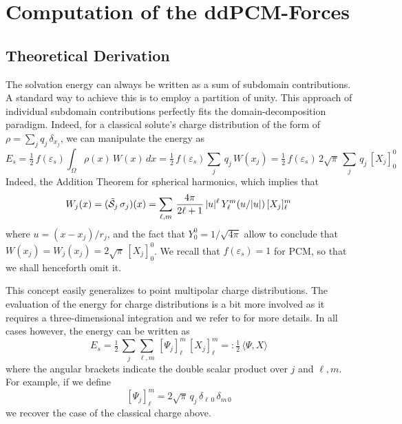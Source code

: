 \section{Computation of the ddPCM-Forces}\label{sec:forces}

\subsection{Theoretical Derivation}

The solvation energy can always be written as a sum of subdomain contributions. A standard way to achieve this is to employ a partition of unity. This  approach of individual subdomain contributions perfectly fits the domain-decomposition paradigm. Indeed, for a classical solute's charge distribution of the form of $\rho=\sum_j q_j \, \delta_{x_j}$, we can manipulate the energy as
\[
	E_s 
	= \tfrac{1}{2} \, f(\varepsilon_s)  \int_{\Omega} \rho(x) \, W(x) \, dx
	= \tfrac{1}{2} \, f(\varepsilon_s) \sum_j \, q_j \,  W(x_j)
	= \tfrac{1}{2} \, f(\varepsilon_s) \,{2\sqrt{\pi}}\, \sum_j  \,q_j \, [X_j]_0^0
\]
Indeed, the Addition Theorem for spherical harmonics, which implies that
\[
W_j(x) = (\tilde{\mathcal{S}}_j \, \sigma_j)(x)  = \sum_{\ell,m} \, \frac{4\pi}{ 2\ell + 1} \, |u|^\ell \, Y_\ell^m(u/|u|) \, [X_j]_\ell^m
\]
where $u = (x-x_j)/r_j$, and the fact that $Y_0^0 = 1/ \sqrt{4\pi}$ allow to conclude that $W(x_j) = W_j(x_j) = 2 \sqrt{\pi} \, [X_j]_0^0$. We recall that $f(\varepsilon_s) =1$ for PCM, so that we shall henceforth omit it.

This concept easily generalizes to point multipolar charge distributions. 
The evaluation of the energy for charge distributions is a bit more involved as it requires a three-dimensional integration and we refer to \cite{Lipparini_JCP_ddCOSMO-QM} for more details. In all cases however, the energy can be written as
\[
E_s = \tfrac{1}{2}
 \, \sum_j \sum_{\ell,m} \, [\Psi_j]_\ell^m \,[X_j]_\ell^m
  =: \tfrac{1}{2} 
  \,\langle \Psi, X \rangle
\]
where the angular brackets indicate the double scalar product over $j$ and $\ell,m$.
For example, if we define
\[
	[\Psi_j]_\ell^m = 2{\sqrt{\pi}}\, q_j \, \delta_{\ell\,0} \,\delta_{m\,0}
\]
we recover the case of  the classical charge above.


